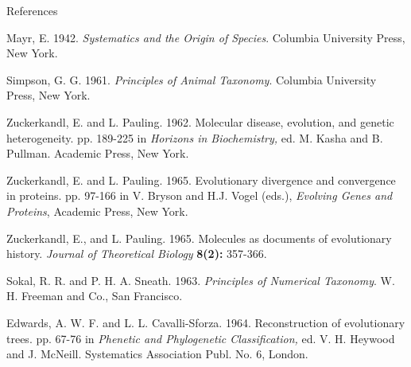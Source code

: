 \documentclass[pdf,bluish,slideColor,colorBG]{prosper}
\begin{document}
%
%
%
%
%
\begin{slide}[Replace]{References}

{\parindent=-0.15in

Mayr, E.  1942.  {\it Systematics and the Origin of Species}.  Columbia
University Press, New York.

Simpson, G. G.  1961.  {\it Principles of Animal Taxonomy}.  Columbia
University Press, New York.

Zuckerkandl, E. and L. Pauling.  1962.  Molecular disease, evolution,
and genetic heterogeneity.  pp. 189-225 in {\it Horizons in Biochemistry,}
ed. M. Kasha and B. Pullman.  Academic Press, New York.

Zuckerkandl, E. and L. Pauling. 1965. Evolutionary divergence and convergence in
proteins. pp. 97-166 in V. Bryson and H.J. Vogel (eds.), {\it Evolving Genes
and Proteins}, Academic Press, New York.

Zuckerkandl, E., and L. Pauling. 1965. Molecules as documents of evolutionary
history. {\it Journal of Theoretical Biology} {\bf 8(2):} 357-366.

Sokal, R. R. and P. H. A. Sneath.  1963.  {\it Principles of Numerical
Taxonomy}.  W. H. Freeman and Co., San Francisco.

Edwards, A. W. F. and L. L. Cavalli-Sforza.  1964.  Reconstruction of
evolutionary trees. pp. 67-76 in {\it Phenetic and Phylogenetic
Classification,} ed. V. H. Heywood and J. McNeill.
Systematics Association Publ. No. 6, London.

}
\end{slide}
\end{document}
